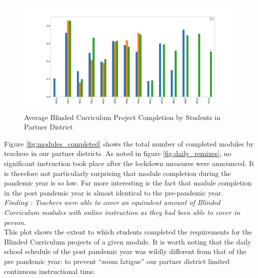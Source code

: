 \documentclass[sigconf,manuscript,review,anonymous]{acmart} %
\def\ts{TIPP\&SEE}
\newcommand{\Scratchencore}[0]{Blinded Curriculum}
\begin{document}
\begin{figure}
     \centering
     \includegraphics[width=\textwidth]{images/graphs/ProjectCompletion.png}
     \caption{Average \Scratchencore{} Project Completion by Students in Partner District}
     \label{fig:project_completion}
    
\end{figure}

Figure \ref{fig:modules_completed} shows the total number of completed modules by 
teachers in our partner districts. As noted in figure \ref{fig:daily_remixes}, 
no significant instruction took place after the lockdown measures were announced. It is 
therefore not particularly surprising that module completion during the pandemic year 
is so low. Far more interesting is the fact that module completion in the post pandemic 
year is almost identical to the pre-pandemic year. 
\\
\textit{Finding : Teachers were able to cover an equivalent amount
of \Scratchencore{} modules with online instruction as they had been able to cover in person.}
\\
This plot shows the extent to which students completed the requirements for the
\Scratchencore{} projects of a given module. It is worth noting
that the daily school schedule of the post pandemic year was wildly different from that
of the pre pandemic year: to prevent “zoom fatigue” our partner district  limited 
continuous instructional time.
\end{document}
